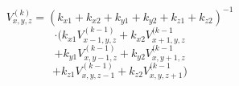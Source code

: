\documentclass[12pt]{article}
\begin{document}
\begin{displaymath}
V_{x,y,z}^{(k)} = (k_{x1}+k_{x2}+k_{y1}+k_{y2}+k_{z1}+k_{z2})^{-1}
\end{displaymath}
\begin{displaymath}
\cdot (k_{x1}V_{x-1,y,z}^{(k-1)}+k_{x2}V_{x+1,y,z}^{(k-1}
\end{displaymath}
\begin{displaymath}
+k_{y1}V_{x,y-1,z}^{(k-1)}+k_{y2}V_{x,y+1,z}^{(k-1}
\end{displaymath}
\begin{displaymath}
+k_{z1}V_{x,y,z-1}^{(k-1)}+k_{z2}V_{x,y,z+1}^{(k-1})
\end{displaymath}
\end{document}
